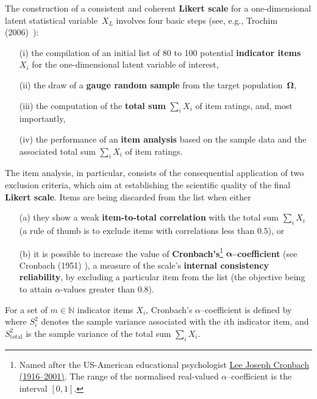 \medskip
\noindent
The construction of a consistent and coherent \textbf{Likert scale} 
for a one-dimensional latent statistical variable~$X_{L}$ involves 
four basic steps (see, e.g., Trochim (2006)~):\\[-5mm]
%
\begin{itemize}
\item[(i)] the compilation of an initial list of 80 to 100 
potential \textbf{indicator items} $X_{i}$ for the one-dimensional 
latent variable of interest,\\[-5mm]

\item[(ii)] the draw of a \textbf{gauge random sample} from the 
target population~$\boldsymbol{\Omega}$,\\[-5mm]

\item[(iii)] the computation of the \textbf{total sum} 
${\displaystyle\sum_{i}X_{i}}$ of item ratings, and, most 
importantly, \\[-5mm]

\item[(iv)] the performance of an \textbf{item analysis} based on
the sample data and the associated total sum 
${\displaystyle\sum_{i}X_{i}}$ of item ratings.\\[-5mm]
\end{itemize}
%
The item analysis, in particular, consists of the consequential 
application of two exclusion criteria, which aim at establishing 
the scientific quality of the final \textbf{Likert scale}. Items
are being discarded from the list when either\\[-6mm]
%
\begin{itemize}
\item[(a)] they show a weak \textbf{item-to-total 
correlation} with the total sum ${\displaystyle\sum_{i}X_{i}}$ (a 
rule of thumb is to exclude items with correlations less than 
$0.5$), or\\[-6mm]
  
\item[(b)] it is possible to increase the value of
\textbf{Cronbach's}\footnote{Named 
after the US-American educational psychologist
\href{http://en.wikipedia.org/wiki/Lee_Cronbach}{Lee Joseph 
Cronbach (1916--2001)}. The range of the normalised real-valued
$\alpha$--coefficient is the interval $[0,1]$.} 
$\boldsymbol{\alpha}$\textbf{--coefficient} (see Cronbach (1951) 
), a measure of the scale's \textbf{internal
consistency reliability}, by excluding a particular item from the
list (the objective being to attain $\alpha$-values greater than
$0.8$).\\[-6mm]
\end{itemize}
%
For a set of $m \in \mathbb{N}$ indicator items $X_{i}$, 
Cronbach's $\alpha$--coefficient is defined by
%
\be
{}
\ee
%
where $S_{i}^{2}$ denotes the sample variance associated with the 
$i$th indicator item,
and $S_\mathrm{total}^{2}$ is the sample variance of the total sum 
${\displaystyle\sum_{i}X_{i}}$.

